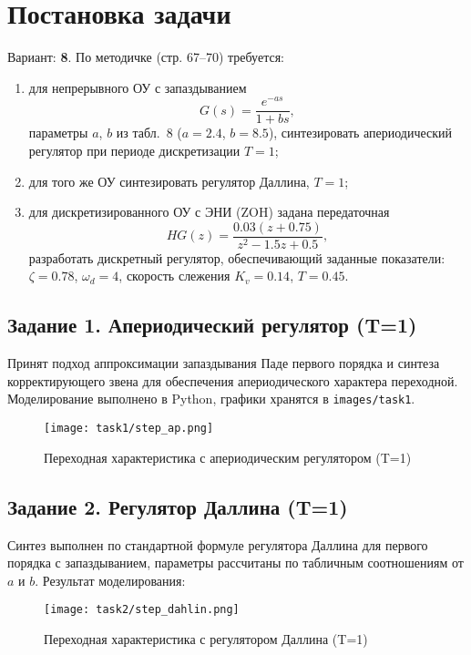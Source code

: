 
\chapter{Постановка задачи}
Вариант: \textbf{8}. По методичке (стр. 67–70) требуется:
\begin{enumerate}
    \item для непрерывного ОУ с запаздыванием
    \[
        G(s) = \frac{e^{-a s}}{1 + b s},
    \]
    параметры $a$, $b$ из табл.~8 ($a=2.4$, $b=8.5$), синтезировать апериодический регулятор при периоде дискретизации $T=1$;
    \item для того же ОУ синтезировать регулятор Даллина, $T=1$;
    \item для дискретизированного ОУ с ЭНИ (ZOH) задана передаточная
    \[
        HG(z)= \frac{0.03(z+0.75)}{z^2 - 1.5 z + 0.5},
    \]
    разработать дискретный регулятор, обеспечивающий заданные показатели: $\zeta=0.78$, $\omega_d=4$, скорость слежения $K_v=0.14$, $T=0.45$.
\end{enumerate}

\section{Задание 1. Апериодический регулятор (T=1)}
Принят подход аппроксимации запаздывания Паде первого порядка и синтеза корректирующего звена для обеспечения апериодического характера переходной. Моделирование выполнено в Python, графики хранятся в \texttt{images/task1}.

\begin{figure}[H]
    \centering
    \texttt{[image: task1/step\_ap.png]}
    \caption{Переходная характеристика с апериодическим регулятором (T=1)}
\end{figure}

\section{Задание 2. Регулятор Даллина (T=1)}
Синтез выполнен по стандартной формуле регулятора Даллина для первого порядка с запаздыванием, параметры рассчитаны по табличным соотношениям от $a$ и $b$. Результат моделирования:

\begin{figure}[H]
    \centering
    \texttt{[image: task2/step\_dahlin.png]}
    \caption{Переходная характеристика с регулятором Даллина (T=1)}
\end{figure}

